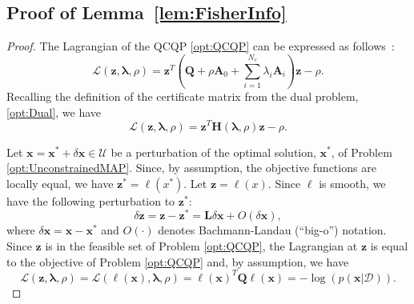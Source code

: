 \documentclass[lettersize,journal]{IEEEtran}
\begin{document}
\subsection{Proof of Lemma~\ref{lem:FisherInfo}}\label{App:lemma1Proof}
\begin{proof}
The Lagrangian of the QCQP \eqref{opt:QCQP} can be expressed as follows~\cite{boydConvexOptimization2004}:
\begin{equation*}
	\mathcal{L}(\bm{z},\bm{\lambda}, \rho) = \bm{z}^T \left(\bm{Q} + \rho\bm{A}_0 +\sum\limits_{i=1}^{N_c} \lambda_i \bm{A}_i\right) \bm{z} - \rho.
\end{equation*}
Recalling the definition of the certificate matrix from the dual problem, \eqref{opt:Dual}, we have
\begin{equation*}
	\mathcal{L}(\bm{z},\bm{\lambda}, \rho) = \bm{z}^T \bm{H}(\bm{\lambda}, \rho) \bm{z} - \rho.
\end{equation*}

Let $\bm{x} = \bm{x}^*+\delta\bm{x} \in \mathcal{U}$ be a perturbation of the optimal solution, $\bm{x}^*$, of Problem \eqref{opt:UnconstrainedMAP}. Since, by assumption, the objective functions are locally equal, we have $\bm{z}^* = \bm{\ell}(x^*)$.  Let $\bm{z}= \bm{\ell}(x)$. Since $\bm{\ell}$ is smooth, we have the following perturbation to $\bm{z}^*$:
\begin{equation}\label{eqn:z_pert}
	\delta\bm{z} = \bm{z} - \bm{z}^* = \bm{L} \delta\bm{x} + O(\delta\bm{x}),
\end{equation}
where $\delta\bm{x}=\bm{x} - \bm{x}^*$ and $O(\cdot)$ denotes Bachmann-Landau (``big-o'') notation. Since $\bm{z}$ is in the feasible set of Problem \eqref{opt:QCQP}, the Lagrangian at $\bm{z}$ is equal to the objective of Problem \eqref{opt:QCQP} and, by assumption, we have
\begin{equation*}
	\mathcal{L}(\bm{z},\bm{\lambda}, \rho) =\mathcal{L}(\bm{\ell}(\bm{x}),\bm{\lambda}, \rho)=\bm{\ell}(\bm{x})^T\bm{Q}\bm{\ell}(\bm{x}) = -\log(p(\bm{x} \vert \bm{\mathcal{D}})).
\end{equation*}


\end{proof}
\end{document}
